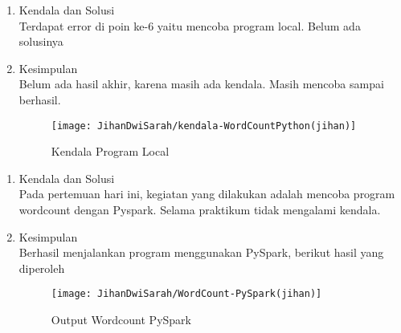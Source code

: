 \begin{enumerate}
\item Kendala dan Solusi \\
Terdapat error di poin ke-6 yaitu mencoba program local. Belum ada solusinya 

\item Kesimpulan\\
Belum ada hasil akhir, karena masih ada kendala. Masih mencoba sampai berhasil.
\begin{figure}[!ht]
\texttt{[image: JihanDwiSarah/kendala-WordCountPython(jihan)]}
\caption{Kendala Program Local}
\label{gam:kendala-WordCountPython(jihan)}
\end{figure}


\end{enumerate}

\begin{enumerate}
\item Kendala dan Solusi \\
Pada pertemuan hari ini, kegiatan yang dilakukan adalah mencoba program  wordcount dengan Pyspark. Selama praktikum tidak mengalami kendala.

\item Kesimpulan\\
Berhasil menjalankan program menggunakan PySpark, berikut hasil yang diperoleh \\

\begin{figure}[!ht]
\texttt{[image: JihanDwiSarah/WordCount-PySpark(jihan)]}
\caption{Output Wordcount PySpark}
\label{gam:WordCount-PySpark(jihan)}
\end{figure}
\end{enumerate}

